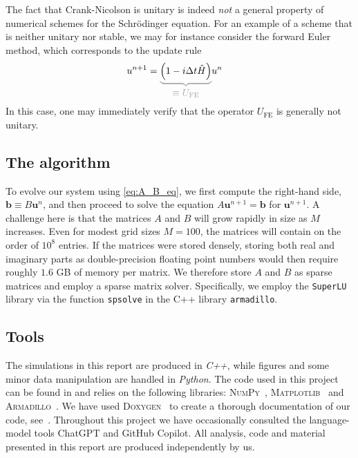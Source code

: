 \documentclass[aps,pra,reprint,amsmath,amssymb,twocolumn,preprintnumbers,superscriptaddress,10pt]{revtex4-2}
\renewcommand{\vec}[1]{\mathbf{#1}}
\begin{document}
The fact that Crank-Nicolson is unitary is indeed \emph{not} a general property of numerical schemes for the Schrödinger equation.
For an example of a scheme that is neither unitary nor stable, we may for instance consider the forward Euler method, which corresponds to the update rule
\begin{align}
    u^{n+1} 
    &=
    \textcolor{gray!70}{
        \underbrace{
        \textcolor{black}{
        \left( 1 - i \Delta t \hat{H} \right)    
        }}_{\raisebox{-3pt}{$\equiv U_{\text{FE}}$}} 
    }
    u^{n}
\end{align}
In this case, one may immediately verify that the operator \(U_{\text{FE}}\) is generally not unitary.

\subsection{The algorithm}  \label{sec:Algorithm}
To evolve our system using \eqref{eq:A_B_eq}, we first compute the right-hand side, $\vec{b}\equiv B\vec{u}^n$, and then proceed to solve the equation $A \vec{u}^{n+1} = \vec{b}$ for $\vec{u}^{n+1}$.
A challenge here is that the matrices \(A\) and \(B\) will grow rapidly in size as \(M\) increases. 
Even for modest grid sizes $M=100$, the matrices will contain on the order of \(10^8\) entries.
If the matrices were stored densely, storing both real and imaginary parts as double-precision floating point numbers would then require roughly $1.6$ GB of memory per matrix.
We therefore store $A$ and $B$ as sparse matrices and employ a sparse matrix solver.
Specifically, we employ the \texttt{SuperLU} library via the function \texttt{spsolve} in the C++ library \texttt{armadillo}.

\subsection{Tools}  \label{sec:tools}
The simulations in this report are produced in \textit{C++}, while figures and some minor data manipulation are handled in \textit{Python}.
The code used in this project can be found in \cite{FYS4150Project5} and relies on the following libraries: \textsc{NumPy}~\cite{numpy}, \textsc{Matplotlib}~\cite{matplotlib} and \textsc{Armadillo}~\cite{armadillo}. 
We have used \textsc{Doxygen}~\cite{doxygen} to create a thorough documentation of our code, see~\cite{FYS4150Project5_doc}. 
Throughout this project we have occasionally consulted the language-model tools ChatGPT and GitHub Copilot. 
All analysis, code and material presented in this report are produced independently by us.
\end{document}
